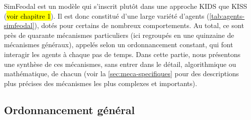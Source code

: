 SimFeodal est un modèle qui s'inscrit plutôt dans une approche KIDS que KISS (\hl{voir chapitre 1}).
Il est donc constitué d'une large variété d'agents (\cref{tab:agents-simfeodal}), dotés pour certains de nombreux comportements.
Au total, ce sont près de quarante mécanismes particuliers (ici regroupés en une quinzaine de mécanismes généraux), appelés selon un ordonnancement constant, qui font interagir les agents à chaque pas de temps.
Dans cette partie, nous présentons une synthèse de ces mécanismes, sans entrer dans le détail, algorithmique ou mathématique, de chacun (voir la \cref{sec:meca-specifiques} pour des descriptions plus précises des mécanismes les plus complexes et importants).

\subsection{Ordonnancement général}

